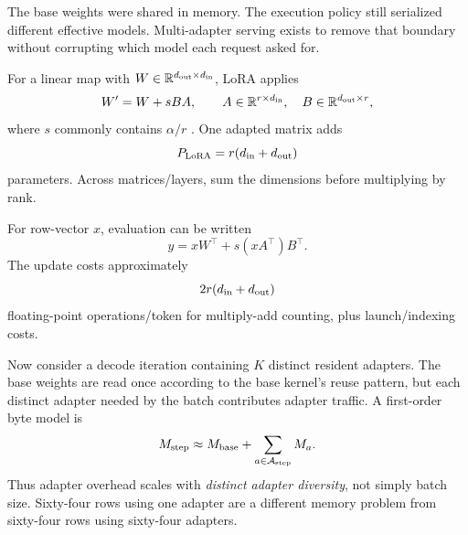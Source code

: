 The base weights were shared in memory. The execution policy still serialized
different effective models. Multi-adapter serving exists to remove that boundary
without corrupting which model each request asked for.



For a linear map with
$W\in\mathbb{R}^{d_{\rm out}\times d_{\rm in}}$, LoRA applies
\begin{equation}
W' = W + sBA,\qquad
A\in\mathbb{R}^{r\times d_{\rm in}},\quad
B\in\mathbb{R}^{d_{\rm out}\times r},
\label{eq:lora-update}
\end{equation}
where $s$ commonly contains $\alpha/r$ \cite{hu2022lora}. One adapted matrix adds
\[
P_{\rm LoRA}=r(d_{\rm in}+d_{\rm out})
\]
parameters. Across matrices/layers, sum the dimensions before multiplying by rank.

For row-vector $x$, evaluation can be written
\[
y=xW^\top+s(xA^\top)B^\top.
\]
The update costs approximately
\[
2r(d_{\rm in}+d_{\rm out})
\]
floating-point operations/token for multiply-add counting, plus launch/indexing costs.

Now consider a decode iteration containing $K$ distinct resident adapters. The base
weights are read once according to the base kernel's reuse pattern, but each distinct
adapter needed by the batch contributes adapter traffic. A first-order byte model is
\[
M_{\rm step}\approx M_{\rm base}+ \sum_{a\in\mathcal A_{\rm step}}M_a.
\]
Thus adapter overhead scales with \emph{distinct adapter diversity}, not simply batch
size. Sixty-four rows using one adapter are a different memory problem from sixty-four
rows using sixty-four adapters.

